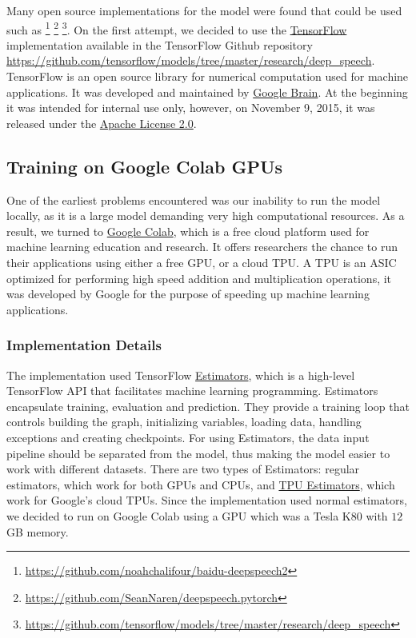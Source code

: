 Many open source implementations for the model were found that could be used such as \footnote{\url{https://github.com/noahchalifour/baidu-deepspeech2}} \footnote{\url{https://github.com/SeanNaren/deepspeech.pytorch}} \footnote{\url{https://github.com/tensorflow/models/tree/master/research/deep_speech}}. On the first attempt, we decided to use the \href{https://www.tensorflow.org/}{TensorFlow} \cite{tensorflow2015-whitepaper} implementation available in the TensorFlow Github repository \url{https://github.com/tensorflow/models/tree/master/research/deep_speech}. TensorFlow is an open source library for numerical computation used for machine applications. It was developed and maintained by \href{https://ai.google/research/teams/brain}{Google Brain}. At the beginning it was intended for internal use only, however, on  November 9, 2015, it was released under the \href{http://www.apache.org/licenses/LICENSE-2.0}{Apache License 2.0}.

\subsection{Training on Google Colab GPUs}
\label{meth:s3_sub1}

One of the earliest problems encountered was our inability to run the model locally, as it is a large model demanding very high computational resources. As a result, we turned to \href{https://colab.research.google.com/}{Google Colab}, which is a free cloud platform used for machine learning education and research. It offers researchers the chance to run their applications using either a free GPU, or a cloud \ac{TPU}. A \ac{TPU} is an \ac{ASIC} optimized for performing high speed addition and multiplication operations, it was developed by Google for the purpose of speeding up machine learning applications. 

\subsubsection{Implementation Details}
\label{meth:s3_sub1_subsub1}

The implementation used TensorFlow \href{https://www.tensorflow.org/guide/estimators}{Estimators}, which is a high-level TensorFlow API that facilitates machine learning programming. Estimators encapsulate training, evaluation and prediction. They provide a training loop that controls building the graph, initializing variables, loading data, handling exceptions and creating checkpoints. For using Estimators, the data input pipeline should be separated from the model, thus making the model easier to work with different datasets. There are two types of Estimators: regular estimators, which work for both GPUs and CPUs, and \href{URL}{TPU Estimators}, which work for Google's cloud \ac{TPU}s. Since the implementation used normal estimators, we decided to run on Google Colab using a GPU which was a Tesla K80 with $12$ GB memory.

